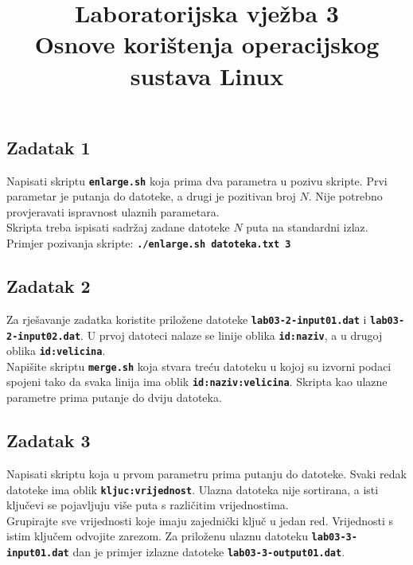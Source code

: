 \documentclass[12pt,a4paper]{article}
\newcommand{\shell}[1]{\texttt{\textbf{#1}}}
\begin{document}
	\title{Laboratorijska vježba 3\\{\small Osnove korištenja operacijskog sustava Linux}\vspace{-2em}}
	\maketitle
	
  \subsection*{Zadatak 1}
  Napisati skriptu \shell{enlarge.sh} koja prima dva parametra u pozivu skripte. Prvi parametar je putanja do datoteke, a drugi je pozitivan broj $N$. Nije potrebno provjeravati ispravnost ulaznih parametara.\\
  
  \noindent Skripta treba ispisati sadržaj zadane datoteke $N$ puta na standardni izlaz.\\
  Primjer pozivanja skripte: \shell{./enlarge.sh datoteka.txt 3}

	\subsection*{Zadatak 2}
  Za rješavanje zadatka koristite priložene datoteke \shell{lab03-2-input01.dat} i \shell{lab03-2-input02.dat}. U prvoj datoteci nalaze se linije oblika \shell{id:naziv}, a u drugoj oblika \shell{id:velicina}.\\
  
  \noindent Napišite skriptu \shell{merge.sh} koja stvara treću datoteku u kojoj su izvorni podaci spojeni tako da svaka linija ima oblik \shell{id:naziv:velicina}. Skripta kao ulazne parametre prima putanje do dviju datoteka.
	
	\subsection*{Zadatak 3}
  Napisati skriptu koja u prvom parametru prima putanju do datoteke. Svaki redak datoteke ima oblik \shell{kljuc:vrijednost}. Ulazna datoteka nije sortirana, a isti ključevi se pojavljuju više puta s različitim vrijednostima.\\
  
  \noindent Grupirajte sve vrijednosti koje imaju zajednički ključ u jedan red. Vrijednosti s istim ključem odvojite zarezom. Za priloženu ulaznu datoteku \shell{lab03-3-input01.dat} dan je primjer izlazne datoteke \shell{lab03-3-output01.dat}.
	
\end{document}
